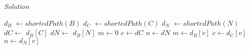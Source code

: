 \documentclass[10pt]{article}
\begin{document}
    \begin{algorithm}[h]
        \caption{\textit{Solution}}
        \begin{algorithmic}[1]  
            \State $d_{B}$ $\leftarrow shortedPath \left(B\right)$   
            \State $d_{C}$ $\leftarrow shortedPath \left(C\right)$ 
            \State $d_{N}$ $\leftarrow shortedPath \left(N\right)$ 
            \State $dC \leftarrow $ $d_{B}\left[C\right]$
            \State $dN \leftarrow $ $d_{B}\left[N\right]$
            \State $m \leftarrow 0 $
            \State $c \leftarrow dC$
            \State $n \leftarrow dN$ 
                    \State $ m \leftarrow d_{B} \left[v\right]$
                    \State $ c \leftarrow d_{C} \left[v\right]$ 
                    \State $ n \leftarrow d_{N} \left[v\right]$ 
                \EndIf 
            \EndFor
        \end{algorithmic}
    \end{algorithm}
\end{document}
